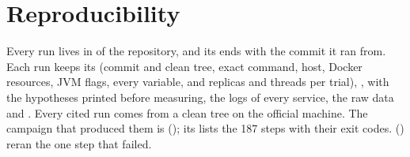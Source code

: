 \section{Reproducibility}
\label{app:runs}

Every run lives in  of the repository, and its  ends with the commit it
ran from. Each run keeps its  (commit and clean tree, exact command, host, Docker resources, JVM
flags, every  variable, and replicas and threads per trial), ,  with
the hypotheses printed before measuring, the logs of every service, the raw data and . Every cited
run comes from a clean tree on the official machine. The campaign that produced them is
 (); its  lists the 187 steps with
their exit codes.  () reran the
one step that failed.

